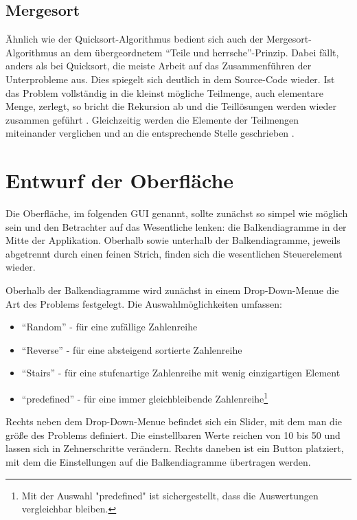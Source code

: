 \subsection{Mergesort}
Ähnlich wie der Quicksort-Algorithmus bedient sich auch der Mergesort-Algorithmus an dem übergeordnetem "`Teile und herrsche"'-Prinzip.
Dabei fällt, anders als bei Quicksort, die meiste Arbeit auf das Zusammenführen der Unterprobleme aus. Dies spiegelt sich deutlich in dem Source-Code wieder.
Ist das Problem vollständig in die kleinst mögliche Teilmenge, auch 
elementare Menge, zerlegt, so bricht die Rekursion ab und die Teillösungen werden wieder zusammen geführt 
\parencite[vgl. S.24]{taschenbuch}. Gleichzeitig werden die
Elemente der Teilmengen miteinander verglichen und an die entsprechende Stelle geschrieben \parencite[vgl.][]{mergesort}.

\section{Entwurf der Oberfläche}
Die Oberfläche, im folgenden GUI genannt, sollte zunächst so simpel wie möglich sein und den Betrachter auf das Wesentliche lenken: die Balkendiagramme in
der Mitte der Applikation. Oberhalb sowie unterhalb der Balkendiagramme, jeweils abgetrennt durch einen feinen Strich, 
finden sich die wesentlichen Steuerelement wieder.

Oberhalb der Balkendiagramme wird zunächst in einem Drop-Down-Menue die Art des Problems festgelegt.
Die Auswahlmöglichkeiten umfassen:

\begin{itemize}
    \item "`Random"' - für eine zufällige Zahlenreihe  
    \item "`Reverse"' - für eine absteigend sortierte Zahlenreihe
    \item "`Stairs"' - für eine stufenartige Zahlenreihe mit wenig einzigartigen Element
    \item "`predefined"' - für eine immer gleichbleibende Zahlenreihe\footnote{Mit der Auswahl "predefined" ist sichergestellt, dass die Auswertungen vergleichbar bleiben.}
\end{itemize}

Rechts neben dem Drop-Down-Menue befindet sich ein Slider, mit dem man die größe des Problems definiert. Die einstellbaren Werte reichen von 10 bis 50
und lassen sich in Zehnerschritte verändern. Rechts daneben ist ein Button platziert, mit dem die Einstellungen auf 
die Balkendiagramme übertragen werden. 
